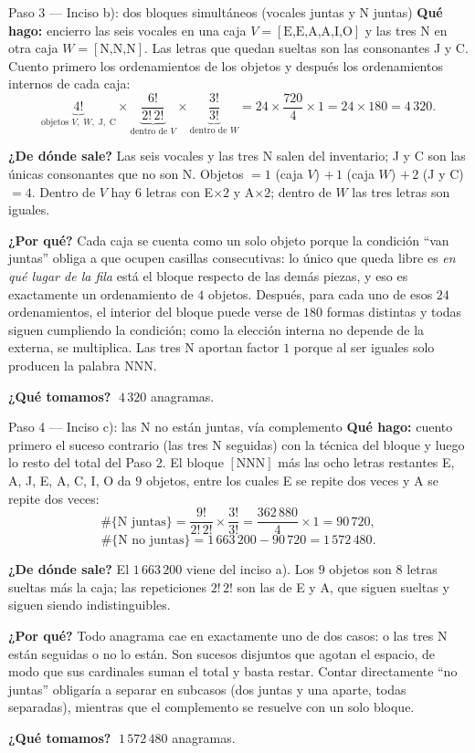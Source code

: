\documentclass[11pt]{article}
\begin{document}
\begin{paso}{Paso 3 --- Inciso b): dos bloques simultáneos (vocales juntas y N juntas)}
\textbf{Qué hago:} encierro las seis vocales en una caja $V=[\text{E,E,A,A,I,O}]$ y las tres N en otra
caja $W=[\text{N,N,N}]$. Las letras que quedan sueltas son las consonantes J y C. Cuento primero los
ordenamientos de los objetos y después los ordenamientos internos de cada caja:
\[
\underbrace{4!}_{\text{objetos } V,\;W,\;\text{J},\;\text{C}}\times
\underbrace{\frac{6!}{2!\,2!}}_{\text{dentro de }V}\times
\underbrace{\frac{3!}{3!}}_{\text{dentro de }W}
=24\times\frac{720}{4}\times 1=24\times 180=4\,320 .
\]

\textbf{¿De dónde sale?} Las seis vocales y las tres N salen del inventario; J y C son las únicas
consonantes que no son N. Objetos $=1$ (caja $V$) $+\,1$ (caja $W$) $+\,2$ (J y C) $=4$. Dentro de $V$ hay
$6$ letras con E$\times2$ y A$\times2$; dentro de $W$ las tres letras son iguales.

\textbf{¿Por qué?} Cada caja se cuenta como un solo objeto porque la condición ``van juntas'' obliga a que
ocupen casillas consecutivas: lo único que queda libre es \emph{en qué lugar de la fila} está el bloque
respecto de las demás piezas, y eso es exactamente un ordenamiento de $4$ objetos. Después, para cada uno
de esos $24$ ordenamientos, el interior del bloque puede verse de $180$ formas distintas y todas siguen
cumpliendo la condición; como la elección interna no depende de la externa, se multiplica. Las tres N
aportan factor $1$ porque al ser iguales solo producen la palabra NNN.

\textbf{¿Qué tomamos?} $\;4\,320$ anagramas.
\end{paso}

\begin{paso}{Paso 4 --- Inciso c): las N no están juntas, vía complemento}
\textbf{Qué hago:} cuento primero el suceso contrario (las tres N seguidas) con la técnica del bloque y
luego lo resto del total del Paso 2. El bloque $[\text{NNN}]$ más las ocho letras restantes
E, A, J, E, A, C, I, O da $9$ objetos, entre los cuales E se repite dos veces y A se repite dos veces:
\[
\#\{\text{N juntas}\}=\frac{9!}{2!\,2!}\times\frac{3!}{3!}=\frac{362\,880}{4}\times 1=90\,720 ,
\]
\[
\#\{\text{N no juntas}\}=1\,663\,200-90\,720=1\,572\,480 .
\]

\textbf{¿De dónde sale?} El $1\,663\,200$ viene del inciso a). Los $9$ objetos son $8$ letras sueltas más
la caja; las repeticiones $2!\,2!$ son las de E y A, que siguen sueltas y siguen siendo indistinguibles.

\textbf{¿Por qué?} Todo anagrama cae en exactamente uno de dos casos: o las tres N están seguidas o no lo
están. Son sucesos disjuntos que agotan el espacio, de modo que sus cardinales suman el total y basta
restar. Contar directamente ``no juntas'' obligaría a separar en subcasos (dos juntas y una aparte, todas
separadas), mientras que el complemento se resuelve con un solo bloque.

\textbf{¿Qué tomamos?} $\;1\,572\,480$ anagramas.
\end{paso}
\end{document}
